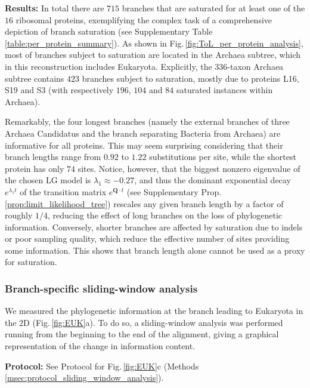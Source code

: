 \begin{appendices}
\noindent \textbf{Results:}        
In total there are $715$ branches that are saturated for at least one of the $16$ ribosomal proteins, exemplifying the complex task of a comprehensive depiction of branch saturation (see Supplementary Table \ref{table:per_protein_summary}). As shown in Fig.\,\ref{fig:ToL_per_protein_analysis}, most of branches subject to saturation are located in the Archaea subtree, which in this reconstruction includes Eukaryota. Explicitly, the $336$-taxon Archaea subtree contains $423$ branches subject to saturation, mostly due to proteins L16, S19 and S3 (with respectively $196$, $104$ and $84$ saturated instances within Archaea).

\medskip

Remarkably, the four longest branches (namely the external branches of three Archaea Candidatus and the branch separating Bacteria from Archaea) are informative for all proteins. This may seem surprising considering that their branch lengths range from $0.92$ to $1.22$ substitutions per site, while the shortest protein has only $74$ sites. Notice, however, that the biggest nonzero eigenvalue of the chosen LG model is $\lambda_1\approx-0.27$, and thus the dominant exponential decay $e^{\lambda_1 t}$ of the transition matrix $e^{\bm{Q}\cdot t}$ (see Supplementary Prop. \ref{prop:limit_likelihood_tree}) rescales any given branch length by a factor of roughly $1/4$, reducing the effect of long branches on the loss of phylogenetic information. Conversely, shorter branches are affected by saturation due to indels or poor sampling quality, which reduce the effective number of sites providing some information. This shows that branch length alone cannot be used as a proxy for saturation.

\bigskip

\subsubsection{Branch-specific sliding-window analysis}\label{suppsec:2DT_sliding_window_analysis}

We measured the phylogenetic information at the branch leading to Eukaryota in the 2D (Fig.\,\ref{fig:EUK}a). To do so, a sliding-window analysis was performed running from the beginning to the end of the alignment, giving a graphical representation of the change in information content.

\medskip

\noindent \textbf{Protocol:} See Protocol for Fig.\,\ref{fig:EUK}c (Methods  \ref{msec:protocol_sliding_window_analysis}).


\end{appendices}
